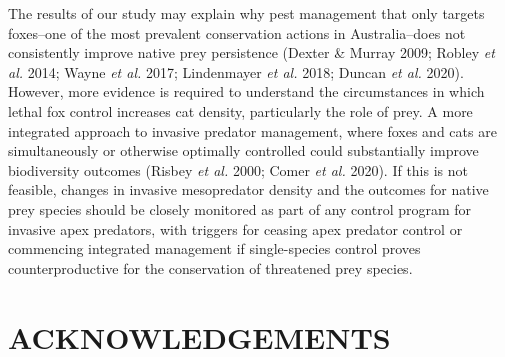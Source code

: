 \documentclass[]{elsarticle} %
\begin{document}
The results of our study may explain why pest management that only targets foxes--one of the most prevalent conservation actions in Australia--does not consistently improve native prey persistence (Dexter \& Murray 2009; Robley \emph{et al.} 2014; Wayne \emph{et al.} 2017; Lindenmayer \emph{et al.} 2018; Duncan \emph{et al.} 2020). However, more evidence is required to understand the circumstances in which lethal fox control increases cat density, particularly the role of prey. A more integrated approach to invasive predator management, where foxes and cats are simultaneously or otherwise optimally controlled could substantially improve biodiversity outcomes (Risbey \emph{et al.} 2000; Comer \emph{et al.} 2020). If this is not feasible, changes in invasive mesopredator density and the outcomes for native prey species should be closely monitored as part of any control program for invasive apex predators, with triggers for ceasing apex predator control or commencing integrated management if single-species control proves counterproductive for the conservation of threatened prey species.

\newpage

\hypertarget{acknowledgements}{%
\section{ACKNOWLEDGEMENTS}\label{acknowledgements}}
\end{document}

